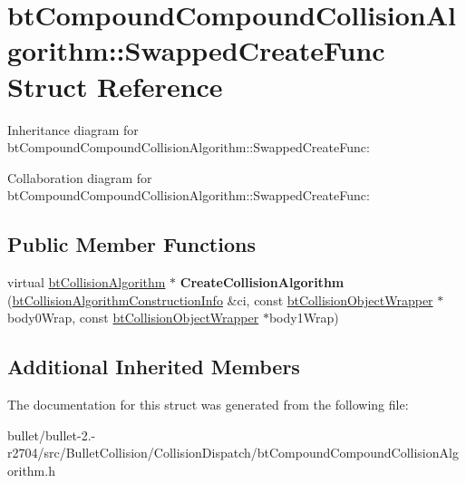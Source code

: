 \hypertarget{structbt_compound_compound_collision_algorithm_1_1_swapped_create_func}{\section{bt\+Compound\+Compound\+Collision\+Algorithm\+:\+:Swapped\+Create\+Func Struct Reference}
\label{structbt_compound_compound_collision_algorithm_1_1_swapped_create_func}
}


Inheritance diagram for bt\+Compound\+Compound\+Collision\+Algorithm\+:\+:Swapped\+Create\+Func\+:


Collaboration diagram for bt\+Compound\+Compound\+Collision\+Algorithm\+:\+:Swapped\+Create\+Func\+:
\subsection*{Public Member Functions}
\begin{DoxyCompactItemize}
\item 
\hypertarget{structbt_compound_compound_collision_algorithm_1_1_swapped_create_func_ad5d739dcfb86455e16f12f56a145541c}{virtual \hyperlink{classbt_collision_algorithm}{bt\+Collision\+Algorithm} $\ast$ {\bfseries Create\+Collision\+Algorithm} (\hyperlink{structbt_collision_algorithm_construction_info}{bt\+Collision\+Algorithm\+Construction\+Info} \&ci, const \hyperlink{structbt_collision_object_wrapper}{bt\+Collision\+Object\+Wrapper} $\ast$body0\+Wrap, const \hyperlink{structbt_collision_object_wrapper}{bt\+Collision\+Object\+Wrapper} $\ast$body1\+Wrap)}\label{structbt_compound_compound_collision_algorithm_1_1_swapped_create_func_ad5d739dcfb86455e16f12f56a145541c}

\end{DoxyCompactItemize}
\subsection*{Additional Inherited Members}


The documentation for this struct was generated from the following file\+:\begin{DoxyCompactItemize}
\item 
bullet/bullet-\/2.-\/r2704/src/\+Bullet\+Collision/\+Collision\+Dispatch/bt\+Compound\+Compound\+Collision\+Algorithm.\+h\end{DoxyCompactItemize}
